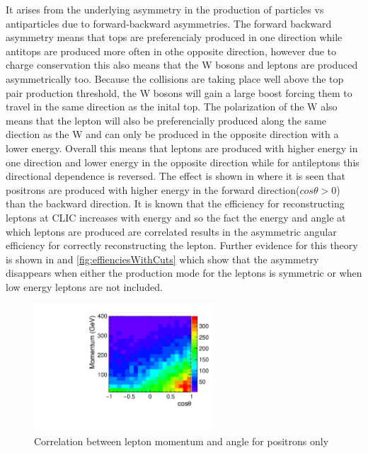 It arises from the underlying asymmetry in the production of particles vs antiparticles due to forward-backward asymmetries. The forward backward asymmetry means that tops are preferencialy produced in one direction while antitops are produced more often in othe opposite direction, however due to charge conservation this also means that the W bosons and leptons are produced asymmetrically too. Because the collisions are taking place well above the top pair production threshold, the W bosons will gain a large boost forcing them to travel in the same direction as the inital top. The polarization of the W also means that the lepton will also be preferencially produced along the same diection as the W and can only be produced in the opposite direction with a lower energy. Overall this means that leptons are produced with higher energy in one direction and lower energy in the opposite direction while for antileptons this directional dependence is reversed. The effect is shown in  where it is seen that positrons are produced with higher energy in the forward direction($cos\theta>0$) than the backward direction. It is known that the efficiency for reconstructing leptons at CLIC increases with energy and so the fact the energy and angle at which leptons are produced are correlated results in the asymmetric angular efficiency for correctly reconstructing the lepton. Further evidence for this theory is shown in  and \ref{fig:effienciesWithCuts} which show that the asymmetry disappears when either the production mode for the leptons is symmetric or when low energy leptons are not included.

\begin{figure}
  \centering
  \includegraphics[width=0.6\textwidth]{TopAnalysis/figures/MomentumVsTheta}
  \caption[Lepton Momentum Vs Angle]{Correlation between lepton momentum and angle for positrons only}
  \label{fig:efficiency2d}
\end{figure}

